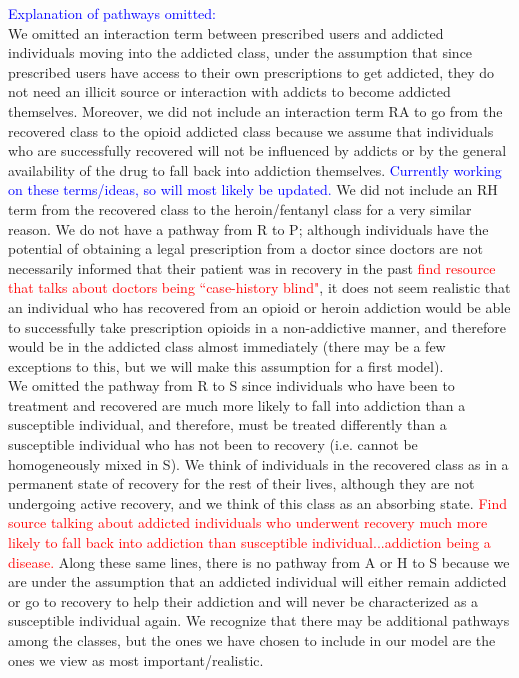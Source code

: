 \documentclass[12pt]{article}
\begin{document}
\textcolor{blue}{Explanation of pathways omitted:} \\
We omitted an interaction term between prescribed users and addicted individuals moving into the addicted class, under the assumption that since prescribed users have access to their own prescriptions to get addicted, they do not need an illicit source or interaction with addicts to become addicted themselves. Moreover, we did not include an interaction term RA to go from the recovered class to the opioid addicted class because we assume that individuals who are successfully recovered will not be influenced by addicts or by the general availability of the drug to fall back into addiction themselves. \textcolor{blue}{Currently working on these terms/ideas, so will most likely be updated.} We did not include an RH term from the recovered class to the heroin/fentanyl class for a very similar reason. We do not have a pathway from R to P; although individuals have the potential of obtaining a legal prescription from a doctor since doctors are not necessarily informed that their patient was in recovery in the past \textcolor{red}{find resource that talks about doctors being ``case-history blind"}, it does not seem realistic that an individual who has recovered from an opioid or heroin addiction would be able to successfully take prescription opioids in a non-addictive manner, and therefore would be in the addicted class almost immediately (there may be a few exceptions to this, but we will make this assumption for a first model).\\


We omitted the pathway from R to S since individuals who have been to treatment and recovered are much more likely to fall into addiction than a susceptible individual, and therefore, must be treated differently than a susceptible individual who has not been to recovery (i.e. cannot be homogeneously mixed in S). We think of individuals in the recovered class as in a permanent state of recovery for the rest of their lives, although they are not undergoing active recovery, and we think of this class as an absorbing state. \textcolor{red}{Find source talking about addicted individuals who underwent recovery much more likely to fall back into addiction than susceptible individual...addiction being a disease.} Along these same lines, there is no pathway from A or H to S because we are under the assumption that an addicted individual will either remain addicted or go to recovery to help their addiction and will never be characterized as a susceptible individual again. We recognize that there may be additional pathways among the classes, but the ones we have chosen to include in our model are the ones we view as most important/realistic. \\ 
\end{document}
